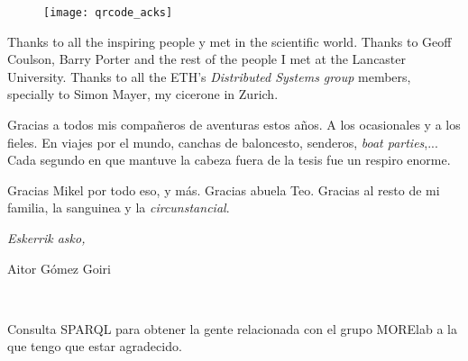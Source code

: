 \begin{acknowledgements}
\begin{figure}[h]
    \centering
    \texttt{[image: qrcode\_acks]}
\end{figure}


Thanks to all the inspiring people y met in the scientific world.
Thanks to Geoff Coulson, Barry Porter and the rest of the people I met at the Lancaster University.
Thanks to all the ETH's \emph{Distributed Systems group} members, specially to Simon Mayer, my cicerone in Zurich. %


Gracias a todos mis compañeros de aventuras estos años.
A los ocasionales y a los fieles.
En viajes por el mundo, canchas de baloncesto, senderos, \emph{boat parties},...
Cada segundo en que mantuve la cabeza fuera de la tesis fue un respiro enorme.


Gracias Mikel por todo eso, y más.
Gracias abuela Teo.
Gracias al resto de mi familia, la sanguinea y la \emph{circunstancial}.


\begin{flushright}
\textit{Eskerrik asko,}

Aitor Gómez Goiri

\monthname \ \the\year



\end{flushright}

\begin{listing}
  \scriptsize
  
  \caption{Consulta SPARQL para obtener la gente relacionada con el grupo MORElab a la que tengo que estar agradecido.}
  \label{lst:workmates_ack}
\end{listing}



\end{acknowledgements}



